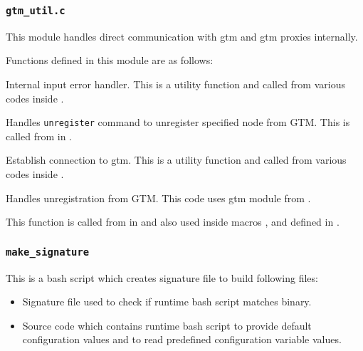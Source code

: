 \subsubsection{\texttt{gtm\_util.c}}

  This module handles direct communication with gtm and gtm proxies internally.
  
  Functions defined in this module are as follows:
  
  
      Internal input error handler.
      This is a utility function and called from various codes inside .
  
  
      Handles \texttt{unregister} command to unregister specified node from GTM.
      This is called from  in .
  
  
      Establish connection to gtm.
      This is a utility function and called from various codes inside .
  
  
      Handles unregistration from GTM.
      This code uses gtm module from .
      
      This function is called from  in  and also used
      inside macros ,  and
	   defined in .



\subsubsection{\texttt{make\_signature}}

  This is a bash script which creates signature file to build following files:
  
  \begin{itemize}
	  \item Signature file used to check if runtime bash script matches  binary.
	  \item Source code which contains runtime bash script to provide default configuration
	  		values and to read predefined configuration variable values.
  \end{itemize}


